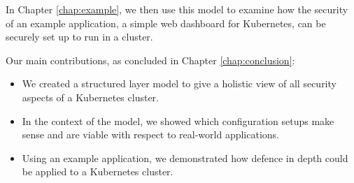 In Chapter \ref{chap:example}, we then use this model to examine how the security of an example application, a simple web dashboard for Kubernetes, can be securely set up to run in a cluster. 

Our main contributions, as concluded in Chapter \ref{chap:conclusion}:

\begin{itemize}
	\item We created a structured layer model to give a holistic view of all security aspects of a Kubernetes cluster.
	\item In the context of the model, we showed which configuration setups make sense and are viable with respect to real-world applications.
	\item Using an example application, we demonstrated how defence in depth could be applied to a Kubernetes cluster.
\end{itemize}



